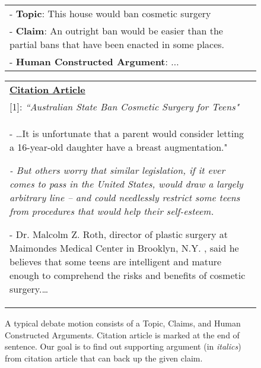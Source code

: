 \begin{figure}[t]
	\fontsize{10}{12}\selectfont
	\setlength{\tabcolsep}{0.8mm}
	\begin{tabular}{|p{75mm}|}
	\hline
	- \textbf{Topic}: This house would ban cosmetic surgery \\
	- \textbf{Claim}: An outright ban would be easier than the partial bans that have been enacted in some places. \\
	- \textbf{Human Constructed Argument}: \color{blue}{$\ldots$This potentially leaves difficulty drawing the line for what is allowed.[1]} $\ldots$ \\ 		\hline
	\end{tabular}

	\begin{tabular}{|p{75mm}|}
	\hline
	\underline{\textbf{Citation Article}}\\
	
	[1]: {\it ``Australian State Ban Cosmetic Surgery for Teens"}\\
	
	- \ldots It is unfortunate that a parent would consider letting a 16-year-old daughter have a breast augmentation."\vspace{.1cm}
	
	{\color{blue}\textit{- But others worry that similar legislation, if it ever comes to pass in the United States, would draw a largely arbitrary line -- and could needlessly restrict some teens from procedures that would help their self-esteem.}}\vspace{.1cm}
	
	- Dr. Malcolm Z. Roth, director of plastic surgery at Maimondes Medical Center in Brooklyn, N.Y. , said he believes that some teens are intelligent and mature enough to comprehend the risks and benefits of cosmetic surgery.\ldots\\
	
	
	\hline
	\end{tabular}
	\caption{\fontsize{10}{12}\selectfont
	A typical debate motion consists of a Topic, Claims, and Human Constructed Arguments. Citation article is marked at the end of sentence. Our goal is to find out supporting argument (in \textit{italics}) from citation article that can back up the given claim.}
\label{fig:example_intro}
\end{figure}

